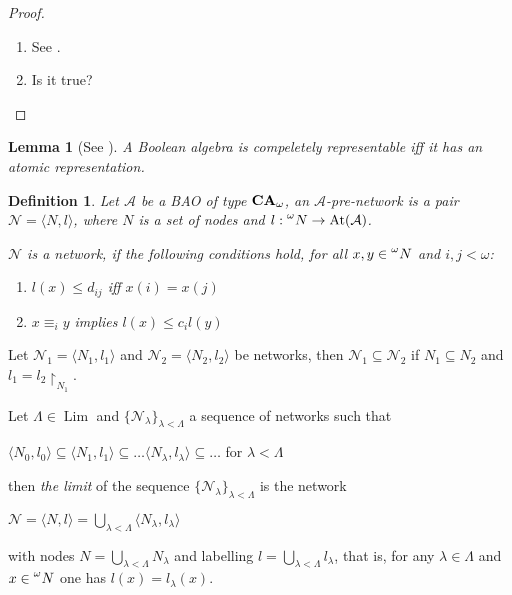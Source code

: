 \documentclass[a4paper]{article}
\theoremstyle{defin}
\newtheorem{defin}{Definition}
\theoremstyle{theorem}
\theoremstyle{prop}
\theoremstyle{lemma}
\newtheorem{lemma}{Lemma}
\theoremstyle{fact}
\theoremstyle{ex}
\theoremstyle{col}
\begin{document}
\begin{proof}
$ $

\begin{enumerate}
  \item See \cite[Remark 2.7.25]{henkin1971cylindric}.
  \item Is it true?
\end{enumerate}
\end{proof}

\begin{lemma}[See \cite{hirsch1997complete}]
  A Boolean algebra is compeletely representable iff it has an atomic representation.
\end{lemma}

\begin{defin}
  Let $\mathcal{A}$ be a BAO of type ${\bf CA}_{\omega}$, an $\mathcal{A}$-pre-network is a pair
  $\mathcal{N} = \langle N, l \rangle$, where $N$ is a set of nodes and $l : \prescript{\omega}{}N \to \operatorname{At}(\mathcal{A})$.

  $\mathcal{N}$ is a network, if the following conditions hold, for all $x, y \in \prescript{\omega}{}N$ and $i, j < \omega$:
  \begin{enumerate}
    \item $l(x) \leq d_{ij}$ iff $x(i) = x(j)$
    \item $x \equiv_i y$ implies $l(x) \leq c_i l(y)$
  \end{enumerate}
\end{defin}

Let $\mathcal{N}_1 = \langle N_1, l_1 \rangle$ and $\mathcal{N}_2 = \langle N_2, l_2 \rangle$ be networks, then $\mathcal{N}_1 \subseteq \mathcal{N}_2$ if $N_1 \subseteq N_2$ and $l_1 = l_2 	\upharpoonright_{N_1}$.

Let $\Lambda \in \operatorname{Lim}$ and $\{ \mathcal{N}_{\lambda}\}_{\lambda < \Lambda}$ a sequence of networks such that
\begin{center}
  $\langle N_0, l_0 \rangle \subseteq \langle N_1, l_1 \rangle \subseteq \dots \langle N_{\lambda}, l_{\lambda} \rangle \subseteq \dots $ for $\lambda < \Lambda$
\end{center}
then \emph{the limit} of the sequence $\{ \mathcal{N}_{\lambda}\}_{\lambda < \Lambda}$ is the network
\begin{center}
  $\mathcal{N} = \langle N, l \rangle = \bigcup \limits_{\lambda < \Lambda} \langle N_{\lambda}, l_{\lambda} \rangle$
\end{center}
with nodes $N = \bigcup \limits_{\lambda < \Lambda} N_{\lambda}$ and labelling $l = \bigcup \limits_{\lambda < \Lambda} l_{\lambda}$, that is,
  for any $\lambda \in \Lambda$ and $x \in \prescript{\omega}{}N$ one has $l(x) = l_{\lambda}(x)$.
\end{document}
